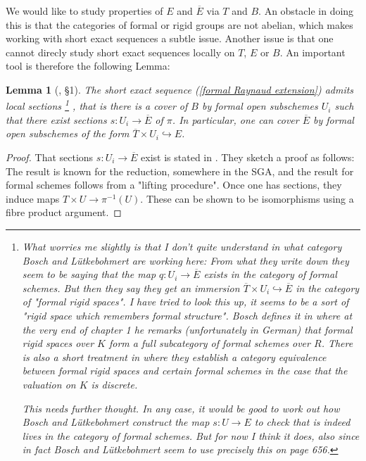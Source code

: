 \documentclass[11pt,oneside]{amsart}
\newtheorem{lemma}[theorem]{Lemma}
\theoremstyle{definition}
\theoremstyle{remark}
\begin{document}
	We would like to study properties of $E$ and $\overline{E}$ via $T$ and $B$. An obstacle in doing this is that the categories of formal or rigid groups are not abelian, which makes working with short exact sequences a subtle issue. Another issue is that one cannot direcly study short exact sequences locally on $T$, $E$ or $B$. An important tool is therefore the following Lemma:
	\begin{lemma}[\cite{BL}, \S 1]\label{formal Raynaud sequence is locally split}
		The short exact sequence (\ref{formal Raynaud extension}) admits local sections	\footnote{\color{red} What worries me slightly is that I don't quite understand in what category Bosch and L\"utkebohmert are working here: From what they write down they seem to be saying that the map $q:U_i\rightarrow \overline{E}$ exists in the category of formal schemes. But then they say they get an immersion $\overline{T}\times U_i\hookrightarrow \overline{E}$ in the category of "formal rigid spaces". I have tried to look this up, it seems to be a sort of "rigid space which remembers formal structure". Bosch defines it in \cite{Bosch defines formal rigid spaces} where at the very end of chapter 1 he remarks (unfortunately in German) that formal rigid spaces over $K$ form a full subcategory of formal schemes over $R$. There is also a short treatment in \cite{FvdP} where they establish a category equivalence between formal rigid spaces and certain formal schemes in the case that the valuation on $K$ is discrete. 
			
		This needs further thought. In any case, it would be good to work out how Bosch and L\"utkebohmert construct the map $s:U\rightarrow E$ to check that is indeed lives in the category of formal schemes. But for now I think it does, also since in fact Bosch and L\"utkebohmert seem to use precisely this on page 656.}
		, that is there is a cover of $B$ by formal open subschemes $U_i$ such that there exist sections $s:U_i\rightarrow \overline{E}$ of $\pi$. In particular, one can cover $\overline{E}$ by formal open subschemes of the form $\overline{T}\times U_i\hookrightarrow E$.
	\end{lemma}
	\begin{proof}
		That sections $s:U_i\rightarrow \overline{E}$ exist is stated in \cite{BL}. They sketch a proof as follows: The result is known for the reduction, somewhere in the SGA, and the result for formal schemes follows from a "lifting procedure". Once 
		one has sections, they induce maps $T\times U\rightarrow \pi^{-1}(U)$. These can be shown to be isomorphisms using a fibre product argument. 
	\end{proof}
\end{document}

